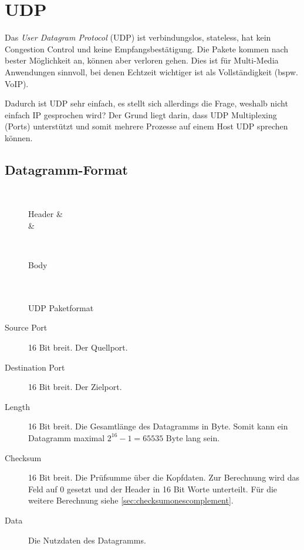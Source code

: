     \section{UDP}
        Das \textit{User Datagram Protocol} (UDP) ist verbindungslos, stateless, hat kein Congestion Control und keine Empfangsbestätigung. Die Pakete kommen nach bester Möglichkeit an, können aber verloren gehen. Dies ist für Multi-Media Anwendungen sinnvoll, bei denen Echtzeit wichtiger ist als Vollständigkeit (bspw. VoIP).
        
        Dadurch ist UDP sehr einfach, es stellt sich allerdings die Frage, weshalb nicht einfach IP gesprochen wird? Der Grund liegt darin, dass UDP Multiplexing (Ports) unterstützt und somit mehrere Prozesse auf einem Host UDP sprechen können.

        \subsection{Datagramm-Format}
            \begin{figure}[H]
            	\centering
            	\begin{bytefield}[bitwidth = 1.2em]{32}
            		 \\
            		\begin{rightwordgroup}{Header}
            			 &  \\
            			 & 
            		\end{rightwordgroup} \\
            		\begin{rightwordgroup}{Body}
	            		 \\
	            		 \\
	            		 \\
            		\end{rightwordgroup}
            	\end{bytefield}
            	\caption{UDP Paketformat}
            	\label{fig:udppacket}
            \end{figure}
            
            \begin{description}
            	\item[Source Port] 16 Bit breit. Der Quellport.
            	\item[Destination Port] 16 Bit breit. Der Zielport.
            	\item[Length] 16 Bit breit. Die Gesamtlänge des Datagramms in Byte. Somit kann ein Datagramm maximal \( 2 ^ 16 - 1 = 65535\text{ Byte} \) lang sein.
            	\item[Checksum] 16 Bit breit. Die Prüfsumme über die Kopfdaten. Zur Berechnung wird das Feld auf 0 gesetzt und der Header in 16 Bit Worte unterteilt. Für die weitere Berechnung siehe \ref{sec:checksumonescomplement}.
            	\item[Data] Die Nutzdaten des Datagramms.
            \end{description}


